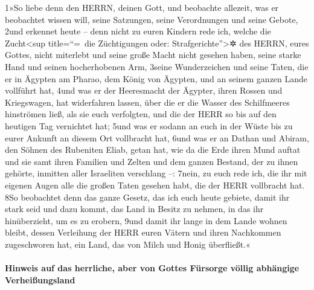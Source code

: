1»So liebe denn den HERRN, deinen Gott, und beobachte allezeit, was er
beobachtet wissen will, seine Satzungen, seine Verordnungen und seine
Gebote, 2und erkennet heute -- denn nicht zu euren Kindern rede ich,
welche die Zucht\textless sup title=``=~die Züchtigungen oder:
Strafgerichte''\textgreater✲ des HERRN, eures Gottes, nicht miterlebt
und seine große Macht nicht gesehen haben, seine starke Hand und seinen
hocherhobenen Arm, 3seine Wunderzeichen und seine Taten, die er in
Ägypten am Pharao, dem König von Ägypten, und an seinem ganzen Lande
vollführt hat, 4und was er der Heeresmacht der Ägypter, ihren Rossen und
Kriegswagen, hat widerfahren lassen, über die er die Wasser des
Schilfmeeres hinströmen ließ, als sie euch verfolgten, und die der HERR
so bis auf den heutigen Tag vernichtet hat; 5und was er sodann an euch
in der Wüste bis zu eurer Ankunft an diesem Ort vollbracht hat, 6und was
er an Dathan und Abiram, den Söhnen des Rubeniten Eliab, getan hat, wie
da die Erde ihren Mund auftat und sie samt ihren Familien und Zelten und
dem ganzen Bestand, der zu ihnen gehörte, inmitten aller Israeliten
verschlang --: 7nein, zu euch rede ich, die ihr mit eigenen Augen alle
die großen Taten gesehen habt, die der HERR vollbracht hat. 8So
beobachtet denn das ganze Gesetz, das ich euch heute gebiete, damit ihr
stark seid und dazu kommt, das Land in Besitz zu nehmen, in das ihr
hinüberzieht, um es zu erobern, 9und damit ihr lange in dem Lande wohnen
bleibt, dessen Verleihung der HERR euren Vätern und ihren Nachkommen
zugeschworen hat, ein Land, das von Milch und Honig überfließt.«

\hypertarget{hinweis-auf-das-herrliche-aber-von-gottes-fuxfcrsorge-vuxf6llig-abhuxe4ngige-verheiuxdfungsland}{%
\paragraph{Hinweis auf das herrliche, aber von Gottes Fürsorge völlig
abhängige
Verheißungsland}\label{hinweis-auf-das-herrliche-aber-von-gottes-fuxfcrsorge-vuxf6llig-abhuxe4ngige-verheiuxdfungsland}}

